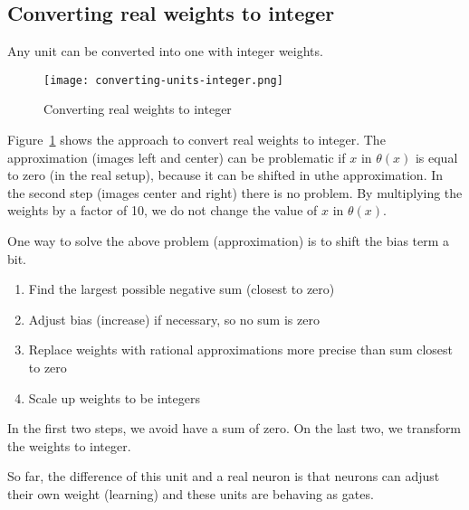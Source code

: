 \documentclass[main]{subfiles}
\begin{document}
\subsection{Converting real weights to integer}
Any unit can be converted into one with integer weights.

\begin{figure}[H]
	\centering
	\texttt{[image: converting-units-integer.png]}
	\caption{Converting real weights to integer}
	\label{fig:converting}
\end{figure}

Figure~\ref{fig:converting} shows the approach to convert real weights to integer. The approximation (images left and center) can be problematic if $x$ in $\theta(x)$ is equal to zero (in the real setup), because it can be shifted in uthe approximation.
In the second step (images center and right) there is no problem. By multiplying the weights by a factor of 10, we do not change the value of $x$ in $\theta(x)$.

One way to solve the above problem (approximation) is to shift the bias term a bit.

\begin{enumerate}
\item Find the largest possible negative sum (closest to zero)
\item Adjust bias (increase) if necessary, so no sum is zero
\item Replace weights with rational approximations more precise than sum closest to zero
\item Scale up weights to be integers
\end{enumerate}

In the first two steps, we avoid have a sum of zero. On the last two, we transform the weights to integer.

So far, the difference of this unit and a real neuron is that neurons can adjust their own weight (learning) and these units are behaving as gates.
\end{document}
